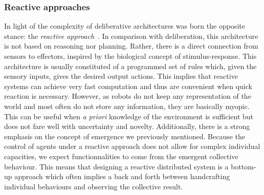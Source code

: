     \subsubsection{Reactive approaches}


      In light of the complexity of deliberative architectures was born the opposite stance: the \emph{reactive approach}~\parencite{Brooks1986}. In comparison with deliberation, this architecture is not based on reasoning nor planning. Rather, there is a direct connection from sensors to effectors, inspired by the biological concept of stimulus-response. This architecture is usually constituted of a programmed set of rules which, given the sensory inputs, gives the desired output actions. This implies that reactive systems can achieve very fast computation and thus are convenient when quick reaction is necessary. However, as robots do not keep any representation of the world and most often do not store any information, they are basically myopic. This can be useful when \emph{a priori} knowledge of the environment is sufficient but does not fare well with uncertainty and novelty. Additionally, there is a strong emphasis on the concept of emergence we previously mentioned. Because the control of agents under a reactive approach does not allow for complex individual capacities, we expect functionnalities to come from the emergent collective behaviour. This means that designing a reactive distributed system is a bottom-up approach which often implies a back and forth between handcrafting individual behaviours and observing the collective result.

